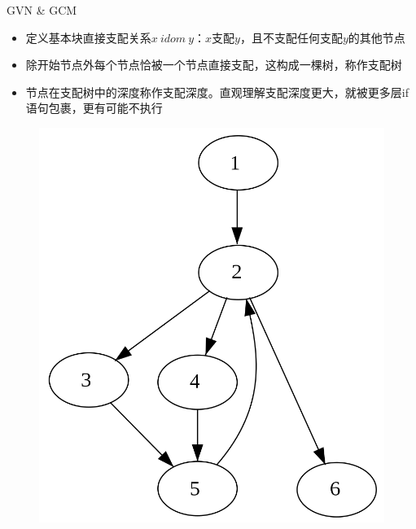 \documentclass{beamer}
\begin{document}
\begin{frame}{GVN \& GCM}
\begin{itemize}
  \item 定义基本块直接支配关系$x\ idom\ y$：$x$支配$y$，且不支配任何支配$y$的其他节点
  \item 除开始节点外每个节点恰被一个节点直接支配，这构成一棵树，称作支配树
  \item 节点在支配树中的深度称作支配深度。直观理解支配深度更大，就被更多层if语句包裹，更有可能不执行
\end{itemize}
\hspace{1cm}
\begin{minipage}{0.3\linewidth}
\begin{figure}[htpb]
  \includegraphics[width=1.0\linewidth]{pic/cfg.png}
\end{figure}
\end{minipage}\hspace{1cm}
\begin{minipage}{0.37\linewidth}
  \begin{figure}[htpb]

\end{figure}
\end{minipage}
\end{frame}
\end{document}
